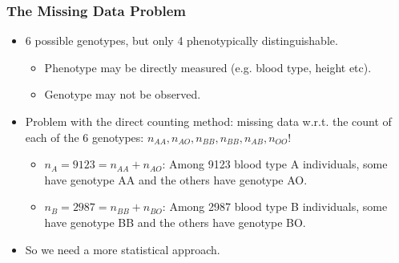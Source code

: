 \documentclass[10pt]{beamer}
\begin{document}
\begin{frame}[fragile]
\frametitle{The Missing Data Problem} 

\begin{itemize}
\item 6 possible genotypes, but only 4 phenotypically distinguishable.
\begin{itemize}
\item Phenotype may be directly measured (e.g. blood type, height etc).
\item Genotype may not be observed.
\end{itemize}
\bigskip

\item Problem with the direct counting method: missing data w.r.t$.$ the count of each of the 6 genotypes: $n_{AA}, n_{AO}, n_{BB}, n_{BB}, n_{AB}, n_{OO}$!
\begin{itemize}
\item $n_A=9123=n_{AA}+n_{AO}$: Among 9123 blood type A individuals, some have genotype AA and the others have genotype AO.

\item $n_B=2987=n_{BB}+n_{BO}$:  Among 2987 blood type B individuals, some have genotype BB and the others have genotype BO.
\end{itemize}
\bigskip

\item So we need a more statistical approach.  
\end{itemize}

\end{frame}
\end{document}
